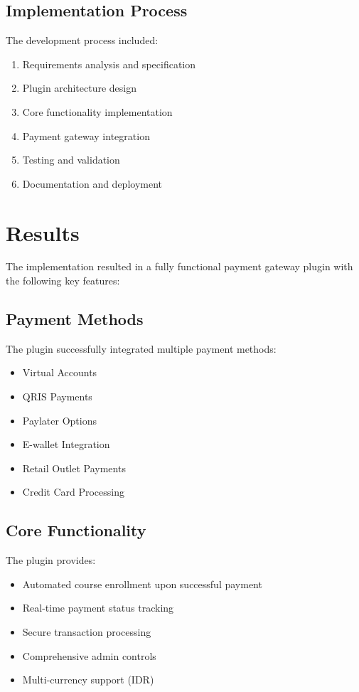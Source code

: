 \documentclass{article} %
\begin{document}
    \subsection{Implementation Process}
    The development process included:
    \begin{enumerate}
        \item Requirements analysis and specification
        \item Plugin architecture design
        \item Core functionality implementation
        \item Payment gateway integration
        \item Testing and validation
        \item Documentation and deployment
    \end{enumerate}

\section{Results}
    The implementation resulted in a fully functional payment gateway plugin with the following key features:

    \subsection{Payment Methods}
    The plugin successfully integrated multiple payment methods:
    \begin{itemize}
        \item Virtual Accounts
        \item QRIS Payments
        \item Paylater Options
        \item E-wallet Integration
        \item Retail Outlet Payments
        \item Credit Card Processing
    \end{itemize}

    \subsection{Core Functionality}
    The plugin provides:
    \begin{itemize}
        \item Automated course enrollment upon successful payment
        \item Real-time payment status tracking
        \item Secure transaction processing
        \item Comprehensive admin controls
        \item Multi-currency support (IDR)
    \end{itemize}
\end{document}
